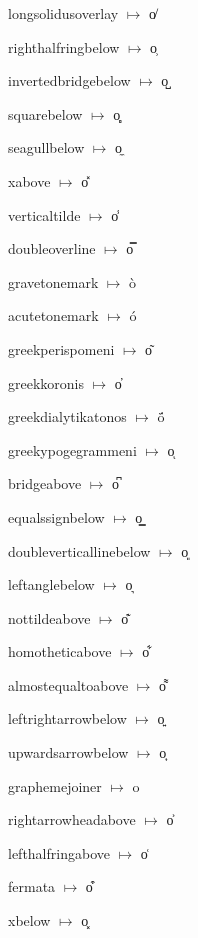 {\noindent longsolidusoverlay $\mapsto$ {\cdmformat o̸}\par
\noindent righthalfringbelow $\mapsto$ {\cdmformat o̹}\par
\noindent invertedbridgebelow $\mapsto$ {\cdmformat o̺}\par
\noindent squarebelow $\mapsto$ {\cdmformat o̻}\par
\noindent seagullbelow $\mapsto$ {\cdmformat o̼}\par
\noindent xabove $\mapsto$ {\cdmformat o̽}\par
\noindent verticaltilde $\mapsto$ {\cdmformat o̾}\par
\noindent doubleoverline $\mapsto$ {\cdmformat o̿}\par
\noindent gravetonemark $\mapsto$ {\cdmformat ò}\par
\noindent acutetonemark $\mapsto$ {\cdmformat ó}\par
\noindent greekperispomeni $\mapsto$ {\cdmformat o͂}\par
\noindent greekkoronis $\mapsto$ {\cdmformat o̓}\par
\noindent greekdialytikatonos $\mapsto$ {\cdmformat ö́}\par
\noindent greekypogegrammeni $\mapsto$ {\cdmformat oͅ}\par
\noindent bridgeabove $\mapsto$ {\cdmformat o͆}\par
\noindent equalssignbelow $\mapsto$ {\cdmformat o͇}\par
\noindent doubleverticallinebelow $\mapsto$ {\cdmformat o͈}\par
\noindent leftanglebelow $\mapsto$ {\cdmformat o͉}\par
\noindent nottildeabove $\mapsto$ {\cdmformat o͊}\par
\noindent homotheticabove $\mapsto$ {\cdmformat o͋}\par
\noindent almostequaltoabove $\mapsto$ {\cdmformat o͌}\par
\noindent leftrightarrowbelow $\mapsto$ {\cdmformat o͍}\par
\noindent upwardsarrowbelow $\mapsto$ {\cdmformat o͎}\par
\noindent graphemejoiner $\mapsto$ {\cdmformat o͏}\par
\noindent rightarrowheadabove $\mapsto$ {\cdmformat o͐}\par
\noindent lefthalfringabove $\mapsto$ {\cdmformat o͑}\par
\noindent fermata $\mapsto$ {\cdmformat o͒}\par
\noindent xbelow $\mapsto$ {\cdmformat o͓}\par
}
